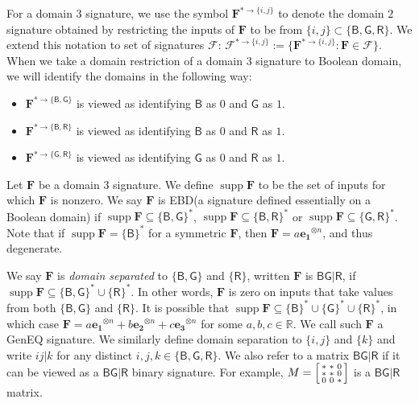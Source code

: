 \documentclass[11pt]{article}
\DeclareMathOperator{\supp}{supp}
\newcommand{\db}{\mathsf{B}}
\newcommand{\dg}{\mathsf{G}}
\newcommand{\dr}{\mathsf{R}}
\newcommand{\geneq}{\textsf{GenEQ}\xspace}
\newcommand{\domres}[1]{
  ^{*\to\{#1\}}
}
\newcommand{\strspt}{\textsf{EBD}\xspace}
\begin{document}
For a domain $3$ signature, we use the symbol $\mathbf{F}\domres{i, j}$ to denote the domain $2$ signature obtained by restricting the inputs of $\mathbf{F}$ to be from $\{i, j\} \subset \{\db, \dg, \dr\}$.
We extend this notation to set of signatures $\mathcal{F}$: $\mathcal{F}\domres{i, j} := \{ \mathbf{F}\domres{i, j} : \mathbf{F} \in \mathcal{F} \}$.
When we take a domain restriction of a domain $3$ signature to Boolean domain, we will identify the domains in the following way:
\begin{itemize}
  \item $\mathbf{F}\domres{\db, \dg}$ is viewed as identifying $\db$ as $0$ and $\dg$ as $1$.
  \item $\mathbf{F}\domres{\db, \dr}$ is viewed as identifying $\db$ as $0$ and $\dr$ as $1$.
  \item $\mathbf{F}\domres{\dg, \dr}$ is viewed as identifying $\dg$ as $0$ and $\dr$ as $1$.
\end{itemize}

Let $\mathbf{F}$ be a domain $3$ signature.
We define $\supp \mathbf{F}$ to be the set of inputs for which $\mathbf{F}$ is nonzero.
We say $\mathbf{F}$ is \strspt (a signature defined essentially on a Boolean domain) if $\supp \mathbf{F} \subseteq \{\db, \dg\}^*$, $\supp \mathbf{F} \subseteq \{\db, \dr\}^*$ or $\supp \mathbf{F} \subseteq \{\dg, \dr\}^*$.
Note that if $\supp \mathbf{F} = \{\db\}^*$ for a symmetric $\mathbf{F}$, then $\mathbf{F} = a \mathbf{e_1}^{\otimes n}$, and thus degenerate.

We say $\mathbf{F}$ is \textit{domain separated} to $\{\db, \dg\}$ and $\{\dr\}$, written $\mathbf{F}$ is $\db \dg | \dr$, if $\supp \mathbf{F} \subseteq \{\db, \dg\}^* \cup \{\dr\}^*$.
In other words, $\mathbf{F}$ is zero on inputs that take values from both $\{\db, \dg\}$ and $\{\dr\}$.
It is possible that $\supp \mathbf{F} \subseteq \{\db\}^* \cup \{\dg\}^* \cup \{\dr\}^*$, in which case $\mathbf{F} =a  \mathbf{e_1}^{\otimes n} + b \mathbf{e_2}^{\otimes n} + c \mathbf{e_3}^{\otimes n}$ for some $a, b, c \in \mathbb{R}$.
We call such $\mathbf{F}$ a \geneq signature.
We similarly define domain separation to $\{i, j\}$ and $\{k\}$ and write $ij | k$ for any distinct $i, j, k \in \{\db, \dg, \dr\}$.
We also refer to a matrix $\db \dg | \dr$ if it can be viewed as a $\db \dg | \dr$ binary signature.
For example, $M = \begin{bsmallmatrix}
  * & * & 0 \\
  * & * & 0 \\
  0 & 0 & *
\end{bsmallmatrix}$ is a $\db \dg | \dr$ matrix.
\end{document}
